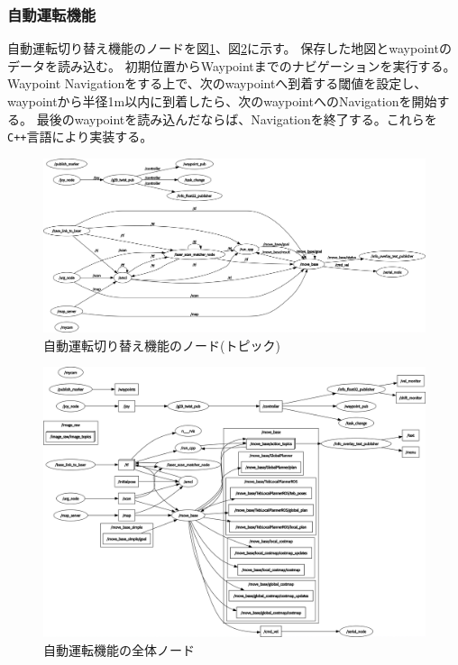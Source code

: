 \subsubsection{自動運転機能}
自動運転切り替え機能のノードを図\ref{auto:change}、図\ref{auto:change2}に示す。
保存した地図とwaypointのデータを読み込む。
初期位置からWaypointまでのナビゲーションを実行する。
Waypoint Navigationをする上で、次のwaypointへ到着する閾値を設定し、waypointから半径1m以内に到着したら、次のwaypointへのNavigationを開始する。
最後のwaypointを読み込んだならば、Navigationを終了する。これらを\verb|C++|言語により実装する。

\begin{figure}[h]
  \begin{center}
    \includegraphics[width=\linewidth]{img/auto_43.png}
    \caption{自動運転切り替え機能のノード(トピック)}
    \label{auto:change}
  \end{center}
\end{figure}

\begin{figure}[h]
  \begin{center}
    \includegraphics[width=\linewidth]{img/auto_44.png}
    \caption{自動運転機能の全体ノード}
    \label{auto:change2}
  \end{center}
\end{figure}

